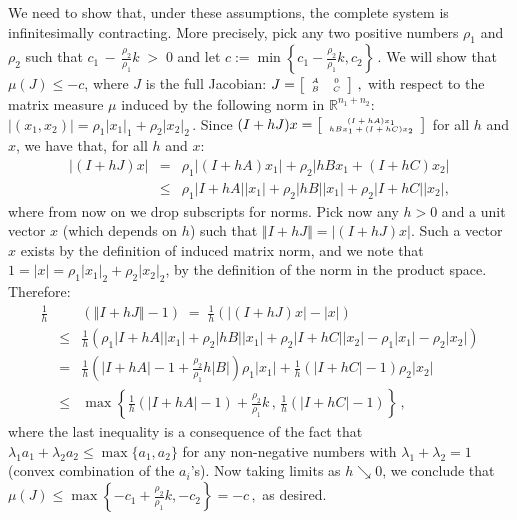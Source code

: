 \documentclass{svmult}
\newcommand{\opteqn}[1]{$#1$}
\newcommand{\R}{{\mathbb R}}  %
\newcommand{\abs}[1]{\left\vert #1 \right\vert}
\newcommand{\norm}[1]{\left\Vert #1 \right\Vert}
\newcommand{\beqn}{\begin{eqnarray*}}
\newcommand{\eeqn}{\end{eqnarray*}}
\newcommand{\cc}{c}
\newcommand{\kk}{k}
\newcommand{\norma}{1}
\newcommand{\normb}{2}
\begin{document}
We need to show that, under these assumptions, the complete system is
infinitesimally contracting.  More precisely, pick any two positive numbers
$\rho _1$ and $\rho _2$ such that 
\opteqn{
\cc_1 \,-\, \frac{\rho _2}{\rho _1} \kk \;>\; 0
}
and let
\opteqn{
\cc := \min \left\{\cc_1 - \frac{\rho _2}{\rho _1} \kk, \cc_2\right\} \,.
}
We will show that $\mu (J)\leq  -\cc$, where $J$ is the full Jacobian:
\opteqn{\tiny 
J = 
\left[ 
\begin{array}{*{20}c}
A & 0 \\
B & C
\end{array} \right]\,,
}
with respect to the matrix measure $\mu $ induced by the following norm in
$\R^{n_1+n_2}$:
\opteqn{
\abs{(x_1,x_2)} = \rho _1 \abs{x_1}_{\norma} + \rho _2 \abs{x_2}_{\normb} \,.
}
Since
\opteqn{\tiny
(I+hJ)x = 
\left[ 
\begin{array}{*{20}c}
(I+hA)x_1  \\
hBx_1 + (I+hC)x_2
\end{array} \right]
}
for all $h$ and $x$, we have that, for all $h$ and $x$:
\beqn
\abs{(I+hJ)x}
&=&
\rho _1\abs{(I+hA)x_1} + \rho _2 \abs{hBx_1 + (I+hC)x_2}\\
&\leq &
\rho _1\abs{I+hA}\abs{x_1} +
\rho _2\abs{hB}\abs{x_1} +
\rho _2\abs{I+hC}\abs{x_2},
\eeqn
where from now on we drop subscripts for norms.
Pick now any $h>0$
and a unit vector $x$ (which depends on $h$)
such that $\norm{I+hJ} = \abs{(I+hJ)x}$.
Such a vector $x$ exists by the definition of induced matrix norm, and we note
that $1= \abs{x} = \rho _1\abs{x_1}_{\normb}+\rho _2\abs{x_2}_{\normb}$, by the definition of the norm
in the product space.
Therefore:
\beqn
\frac{1}{h} 
&&
\!\!\!\!\!
\left(\norm{I+hJ}-1\right)
\;=\;
\frac{1}{h} \left(\abs{(I+hJ)x}-\abs{x}\right)\\
&\leq &
\frac{1}{h} 
\left(
\rho _1\abs{I+hA}\abs{x_1} +
\rho _2\abs{hB}\abs{x_1} +
\rho _2\abs{I+hC}\abs{x_2}
- \rho _1 \abs{x_1} - \rho _2 \abs{x_2}
\right)\\
&=&
\frac{1}{h} 
\left(\abs{I+hA} -1 + \frac{\rho _2}{\rho _1}h\abs{B} \right) \rho _1\abs{x_1}
+
\frac{1}{h}
\left(\abs{I+hC} - 1 \right) \rho _2\abs{x_2}\\
&\leq &
\max\left\{
\frac{1}{h}\left(\abs{I+hA} -1\right) + \frac{\rho _2}{\rho _1}\kk
\,,\,
\frac{1}{h}\left(\abs{I+hC} - 1 \right)
\right\} \,,
\eeqn
where the last inequality is a consequence of the fact that
$\lambda _1a_1+\lambda _2a_2\leq \max\{a_1,a_2\}$ for any non-negative numbers
with $\lambda _1+\lambda _2=1$ (convex combination of the $a_i$'s).
Now taking limits as $h\searrow0$, we conclude that
\opteqn{
\mu (J)\leq 
\max \left\{-\cc_1 + \frac{\rho _2}{\rho _1} \kk, -\cc_2\right\}
=
-\cc \,,
}
as desired.
\end{document}

